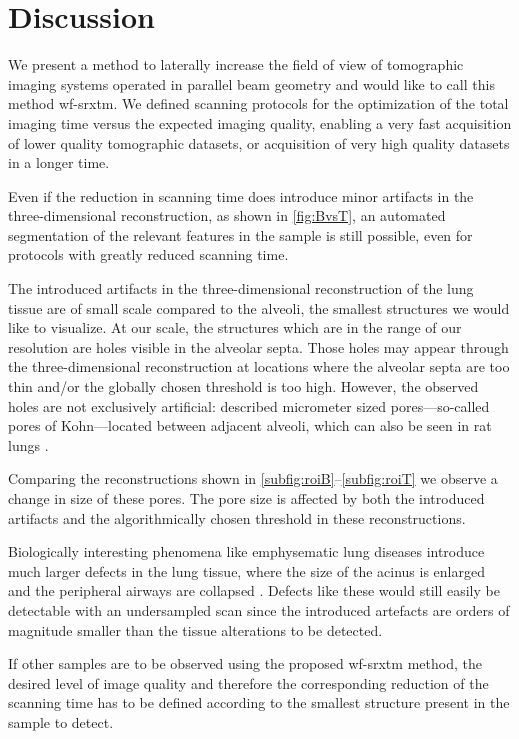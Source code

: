 \section{Discussion}\label{sec:Discussion}
We present a method to laterally increase the field of view of tomographic imaging systems operated in parallel beam geometry and would like to call this method \ac{wf-srxtm}. We defined scanning protocols for the optimization of the total imaging time versus the expected imaging quality, enabling a very fast acquisition of lower quality tomographic datasets, or acquisition of very high quality datasets in a longer time.

Even if the reduction in scanning time does introduce minor artifacts in the three-dimensional reconstruction, as shown in \autoref{fig:BvsT}, an automated segmentation of the relevant features in the sample is still possible, even for protocols with greatly reduced scanning time. 

The introduced artifacts in the three-dimensional reconstruction of the lung tissue are of small scale compared to the alveoli, the smallest structures we would like to visualize. At our scale, the structures which are in the range of our resolution are holes visible in the alveolar septa. Those holes may appear through the three-dimensional reconstruction at locations where the alveolar septa are too thin and/or the globally chosen threshold is too high. However, the observed holes are not exclusively artificial: \citet{Kohn1893} described micrometer sized pores---so-called pores of Kohn---located between adjacent alveoli, which can also be seen in rat lungs \cite{Vanmeir1991}.

Comparing the reconstructions shown in \autoref{subfig:roiB}--\ref{subfig:roiT} we observe a change in size of these pores. The pore size is affected by both the introduced artifacts and the algorithmically chosen threshold in these reconstructions.

Biologically interesting phenomena like emphysematic lung dis\-eases introduce much larger defects in the lung tissue, where the size of the acinus is enlarged and the peripheral airways are collapsed \cite{Weibel2009}. Defects like these would still easily be detectable with an undersampled scan since the introduced artefacts are orders of magnitude smaller than the tissue alterations to be detected.

If other samples are to be observed using the proposed \ac{wf-srxtm} method, the desired level of image quality and therefore the corresponding reduction of the scanning time has to be defined according to the smallest structure present in the sample to detect.

